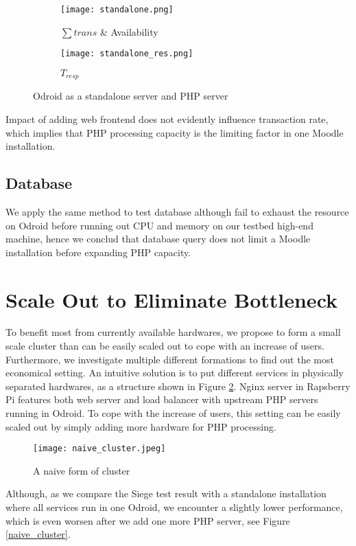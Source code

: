 \begin{figure}[h]
\centering
\begin{subfigure}{0.45\textwidth}
\centering
\texttt{[image: standalone.png]}
\caption{$\sum trans$ \& Availability}
\end{subfigure}
\begin{subfigure}{0.45\textwidth}
\centering
\texttt{[image: standalone\_res.png]}
\caption{$T_{resp}$}
\end{subfigure}
\caption{Odroid as a standalone server and PHP server}
\label{standalone}
\end{figure}

Impact of adding web frontend does not evidently influence transaction rate, which implies that PHP processing capacity is the limiting factor in one Moodle installation.

\subsection{Database}
We apply the same method to test database although fail to exhaust the resource on Odroid before running out CPU and memory on our testbed high-end machine, hence we conclud that database query does not limit a Moodle installation before expanding PHP capacity.

\section{Scale Out to Eliminate Bottleneck}
To benefit most from currently available hardwares, we propose to form a small scale cluster than can be easily scaled out to cope with an increase of users. Furthermore, we investigate multiple different formations to find out the most economical setting. An intuitive solution is to put different services in physically separated hardwares, as a structure shown in Figure \ref{naive_cluster_form}. Nginx server in Rapsberry Pi features both web server and load balancer with upstream PHP servers running in Odroid. To cope with the increase of users, this setting can be easily scaled out by simply adding more hardware for PHP processing.
\begin{figure}[htbp]
\centering
\texttt{[image: naive\_cluster.jpeg]}
\caption{A naive form of cluster}
\label{naive_cluster_form}
\end{figure}
Although, as we compare the Siege test result with a standalone installation where all services run in one Odroid, we encounter a slightly lower performance, which is even worsen after we add one more PHP server, see Figure \ref{naive_cluster}.

